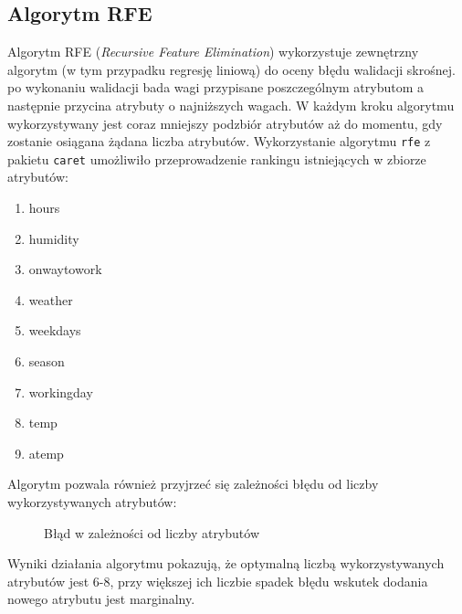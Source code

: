 \documentclass[a4paper,12pt]{article}
\begin{document}
     \subsection{Algorytm RFE}
     Algorytm RFE (\textit{Recursive Feature Elimination}) wykorzystuje zewnętrzny algorytm (w tym przypadku regresję liniową) do oceny błędu walidacji skrośnej. po wykonaniu walidacji bada wagi przypisane poszczególnym atrybutom a następnie przycina atrybuty o najniższych wagach.  W każdym kroku algorytmu wykorzystywany jest coraz mniejszy podzbiór atrybutów aż do momentu, gdy zostanie osiągana żądana liczba atrybutów.
     Wykorzystanie algorytmu \texttt{rfe} z pakietu \texttt{caret} umożliwiło przeprowadzenie rankingu istniejących w zbiorze atrybutów:
     \begin{enumerate}
         \item hours
         \item humidity
         \item onwaytowork
         \item weather
         \item weekdays
         \item season
         \item workingday
         \item temp
         \item atemp
      \end{enumerate}
      Algorytm pozwala również przyjrzeć się zależności błędu od liczby wykorzystywanych atrybutów:

     \begin{figure}[!htb]
        \center
        \caption{Błąd w zależności od liczby atrybutów}
    \end{figure}
       Wyniki działania algorytmu pokazują, że optymalną liczbą wykorzystywanych atrybutów jest 6-8, przy większej ich liczbie spadek błędu wskutek
       dodania nowego atrybutu jest marginalny.
\end{document}
